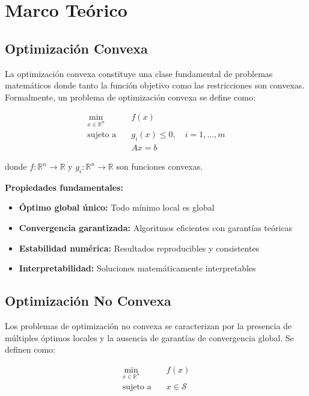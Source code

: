 \documentclass[12pt,a4paper]{article}
\begin{document}
\section{Marco Teórico}

\subsection{Optimización Convexa}

La optimización convexa \cite{boyd2004} constituye una clase fundamental de problemas matemáticos donde tanto la función objetivo como las restricciones son convexas. Formalmente, un problema de optimización convexa se define como:

\begin{equation}
\begin{aligned}
\min_{x \in \mathbb{R}^n} \quad & f(x) \\
\text{sujeto a} \quad & g_i(x) \leq 0, \quad i = 1, \ldots, m \\
& Ax = b
\end{aligned}
\end{equation}

donde $f: \mathbb{R}^n \rightarrow \mathbb{R}$ y $g_i: \mathbb{R}^n \rightarrow \mathbb{R}$ son funciones convexas.

\textbf{Propiedades fundamentales:}
\begin{itemize}
    \item \textbf{Óptimo global único:} Todo mínimo local es global
    \item \textbf{Convergencia garantizada:} Algoritmos eficientes con garantías teóricas
    \item \textbf{Estabilidad numérica:} Resultados reproducibles y consistentes
    \item \textbf{Interpretabilidad:} Soluciones matemáticamente interpretables
\end{itemize}

\subsection{Optimización No Convexa}

Los problemas de optimización no convexa \cite{nocedal2006} se caracterizan por la presencia de múltiples óptimos locales y la ausencia de garantías de convergencia global. Se definen como:

\begin{equation}
\begin{aligned}
\min_{x \in \mathbb{R}^n} \quad & f(x) \\
\text{sujeto a} \quad & x \in \mathcal{S}
\end{aligned}
\end{equation}
\end{document}
